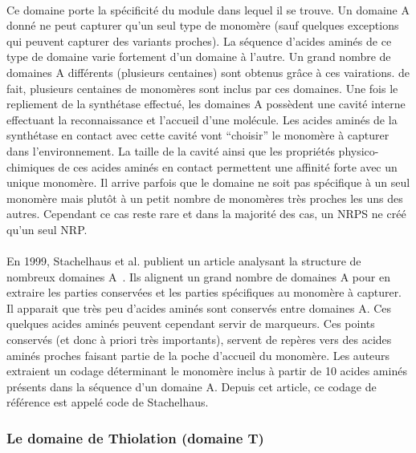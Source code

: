 \documentclass[12pt,french,twoside]{report}
\begin{document}
\paragraph{}Ce domaine porte la spécificité du module dans lequel il se trouve.
Un domaine A donné ne peut capturer qu'un seul type de monomère (sauf quelques exceptions qui peuvent capturer des variants proches).
La séquence d'acides aminés de ce type de domaine varie fortement d'un domaine à l'autre.
Un grand nombre de domaines A différents (plusieurs centaines) sont obtenus grâce à ces vairations.
de fait, plusieurs centaines de monomères sont inclus par ces domaines.
Une fois le repliement de la synthétase effectué, les domaines A possèdent une cavité interne effectuant la reconnaissance et l'accueil d'une molécule.
Les acides aminés de la synthétase en contact avec cette cavité vont ``choisir'' le monomère à capturer dans l'environnement.
La taille de la cavité ainsi que les propriétés physico-chimiques de ces acides aminés en contact permettent une affinité forte avec un unique monomère.
Il arrive parfois que le domaine ne soit pas spécifique à un seul monomère mais plutôt à un petit nombre de monomères très proches les uns des autres.
Cependant ce cas reste rare et dans la majorité des cas, un NRPS ne créé qu'un seul NRP.

\paragraph{}En 1999, Stachelhaus et al. publient un article analysant la structure de nombreux domaines A~\cite{stachelhaus_specificity-conferring_1999}.
Ils alignent un grand nombre de domaines A pour en extraire les parties conservées et les parties spécifiques au monomère à capturer.
Il apparait que très peu d'acides aminés sont conservés entre domaines A.
Ces quelques acides aminés peuvent cependant servir de marqueurs.
Ces points conservés (et donc à priori très importants), servent de repères vers des acides aminés proches faisant partie de la poche d'accueil du monomère.
Les auteurs extraient un codage déterminant le monomère inclus à partir de 10 acides aminés présents dans la séquence d'un domaine A.
Depuis cet article, ce codage de référence est appelé code de Stachelhaus.


\subsubsection{Le domaine de Thiolation (domaine T)}
\end{document}
